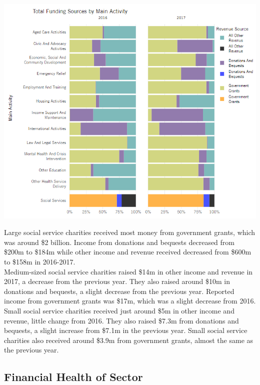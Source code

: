 \documentclass[
  11pt,
]{article}
\let\origfigure\figure
\let\endorigfigure\endfigure
\renewenvironment{figure}[1][2] {
    \expandafter\origfigure\expandafter[H]
} {
    \endorigfigure
}
\begin{document}
\begin{figure}
\centering
\includegraphics{Fig5 Funding Props.PNG}
\caption{Proportion of Funding Sources per Main Activity}
\end{figure}

Large social service charities received most money from government grants, which was around \$2 billion. Income from donations and bequests decreased from \$200m to \$184m while other income and revenue received decreased from \$600m to \$158m in 2016-2017.\\
Medium-sized social service charities raised \$14m in other income and revenue in 2017, a decrease from the previous year. They also raised around \$10m in donations and bequests, a slight decrease from the previous year. Reported income from government grants was \$17m, which was a slight decrease from 2016.\\
Small social service charities received just around \$5m in other income and revenue, little change from 2016. They also raised \$7.3m from donations and bequests, a slight increase from \$7.1m in the previous year. Small social service charities also received around \$3.9m from government grants, almost the same as the previous year.

\hypertarget{financial-health-of-sector}{%
\subsection{Financial Health of Sector}\label{financial-health-of-sector}}
\end{document}

